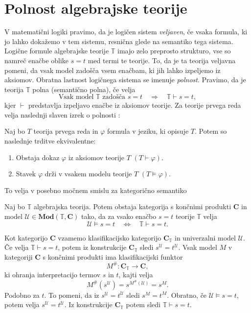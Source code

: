 \documentclass[../kategoricna_logika.tex]{subfiles}
\begin{document}
\section{Polnost algebrajske teorije}
V matematični logiki pravimo, da je logičen sistem \emph{veljaven},
če vsaka formula, ki jo lahko dokažemo v tem sistemu, resnična
glede na semantiko tega sistema. Logične formule algebrajske teorije
$\mathbb{T}$ imajo zelo preprosto strukturo, vse so namreč enačbe
oblike $s = t$ med termi te teorije. To, da je ta teorija veljavna
pomeni, da vsak model zadošča vsem enačbam, ki jih lahko izpeljemo
iz aksiomov. Obratna lastnost logičnega sistema se imenuje \emph{polnost}.
Pravimo, da je teorija $\mathbb{T}$ polna (semantično polna), če velja
$$\text{Vsak model } \mathbb{T} \text{ zadošča }s=t \quad \Longrightarrow
  \quad \mathbb{T} \vdash s = t,$$
kjer $\vdash$ predstavlja izpeljavo enačbe iz aksiomov teorije.
Za teorije prvega reda velja naslednji slaven izrek o polnosti \cite{godel-completeness}:
\begin{izrek}[Gödel]
  Naj bo $T$ teorija prvega reda in $\varphi$ formula v jeziku, ki
  opisuje $T$. Potem so naslednje trditve ekvivalentne:
  \begin{enumerate}
  \item Obstaja dokaz $\varphi$ iz aksiomov teorije $T$
    $(T \vdash \varphi)$.
  \item Stavek $\varphi$ drži v vsakem modelu teorije $T$
    $(T \models \varphi)$.
  \end{enumerate}
\end{izrek}
To velja v posebno močnem smislu za kategorično semantiko
\begin{izrek}
  Naj bo $\mathbb{T}$ algebrajska teorija. Potem obstaja kategorija s
  končnimi produkti $\mathbf{C}$ in model
  $\mathcal{U} \in \mathbf{Mod}(\mathbb{T}, \mathbf{C})$ tako, da za vsako
  enačbo $s = t$ teorije $\mathbb{T}$ velja
$$\mathcal{U} \models s = t \quad \Longleftrightarrow \quad \mathbb{T} \vdash s = t.$$
\end{izrek}
\begin{dokaz}
  Kot kategorijo $\mathbf{C}$ vzamemo klasifikacijsko kategorijo
  $\mathbf{C}_\mathbb{T}$ in univerzalni model $\mathcal{U}$. Če
  velja $\mathbb{T} \vdash s = t$, potem iz konstrukcije
  $\mathbf{C}_\mathbb{T}$ sledi $s^\mathcal{U} =
  t^\mathcal{U}$. Vsak model $M$ v kategoriji $\mathbf{C}$
  s končnimi produkti ima klasifikacijski funktor
  \[  M^{\#} : \mathbf{C}_{\mathbb{T}} \to \mathbf{C}, \]
  ki ohranja interpretacijo termov $s$ in $t$, kajti velja
  \[ M^{\#}(s^\mathcal{U}) = s^{M^{\#}(\mathcal{U})} = s^M. \]
  Podobno za $t$.
  To pomeni, da iz $s^{\mathcal{U}} = t^{\mathcal{U}}$ sledi $s^M = t^M$.
  Obratno, če ${\mathcal{U} \models s = t}$, potem velja $s^{\mathcal{U}} = t^{\mathcal{U}}$.
  Iz konstrukcije $\mathbf{C}_{\mathbb{T}}$ potem sledi ${\mathbb{T} \vdash s = t}$.
\end{dokaz}
\end{document}
